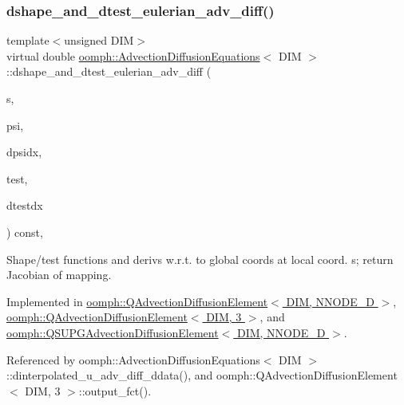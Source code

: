\subsubsection{\texorpdfstring{dshape\+\_\+and\+\_\+dtest\+\_\+eulerian\+\_\+adv\+\_\+diff()}{dshape\_and\_dtest\_eulerian\_adv\_diff()}}
{\footnotesize\ttfamily template$<$unsigned D\+IM$>$ \\
virtual double \hyperlink{classoomph_1_1AdvectionDiffusionEquations}{oomph\+::\+Advection\+Diffusion\+Equations}$<$ D\+IM $>$\+::dshape\+\_\+and\+\_\+dtest\+\_\+eulerian\+\_\+adv\+\_\+diff (\begin{DoxyParamCaption}\item[{const \hyperlink{classoomph_1_1Vector}{Vector}$<$ double $>$ \&}]{s,  }\item[{\hyperlink{classoomph_1_1Shape}{Shape} \&}]{psi,  }\item[{\hyperlink{classoomph_1_1DShape}{D\+Shape} \&}]{dpsidx,  }\item[{\hyperlink{classoomph_1_1Shape}{Shape} \&}]{test,  }\item[{\hyperlink{classoomph_1_1DShape}{D\+Shape} \&}]{dtestdx }\end{DoxyParamCaption}) const\hspace{0.3cm}{\ttfamily [protected]}, {}}



Shape/test functions and derivs w.\+r.\+t. to global coords at local coord. s; return Jacobian of mapping. 



Implemented in \hyperlink{classoomph_1_1QAdvectionDiffusionElement_a968920ec8057c9b5a49154c5845c7dbd}{oomph\+::\+Q\+Advection\+Diffusion\+Element$<$ D\+I\+M, N\+N\+O\+D\+E\+\_\+D $>$}, \hyperlink{classoomph_1_1QAdvectionDiffusionElement_a968920ec8057c9b5a49154c5845c7dbd}{oomph\+::\+Q\+Advection\+Diffusion\+Element$<$ D\+I\+M, 3 $>$}, and \hyperlink{classoomph_1_1QSUPGAdvectionDiffusionElement_a07f5aafc7171048c0237574bf74ab265}{oomph\+::\+Q\+S\+U\+P\+G\+Advection\+Diffusion\+Element$<$ D\+I\+M, N\+N\+O\+D\+E\+\_\+D $>$}.



Referenced by oomph\+::\+Advection\+Diffusion\+Equations$<$ D\+I\+M $>$\+::dinterpolated\+\_\+u\+\_\+adv\+\_\+diff\+\_\+ddata(), and oomph\+::\+Q\+Advection\+Diffusion\+Element$<$ D\+I\+M, 3 $>$\+::output\+\_\+fct().

\mbox{\label{classoomph_1_1AdvectionDiffusionEquations_a354827df2a149258310ffdd0e4c0d40b}} 
